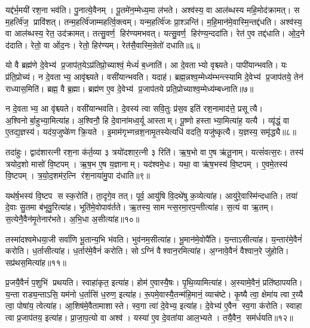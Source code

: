 यद्द॑र्भ॒मयी॑ रश॒ना भव॑ति।
पु॒नात्ये॒वैनम्।
पू॒तमे॑न॒म्मेध्य॒मा ल॑भते।
अश्व॑स्य॒ वा आल॑ब्धस्य महि॒मोद॑क्रामत्।
स म॒हर्त्वि॑ज॒ प्रावि॑शत्।
तन्म॒हर्त्वि॑जाम्महर्त्वि॒क्त्वम्।
यन्म॒हर्त्वि॑जः प्रा॒श्ञन्ति॑।
म॒हि॒मान॑मे॒वास्मि॒न्तद्द॑धति।
अश्व॑स्य॒ वा आल॑ब्धस्य॒ रेत॒ उद॑क्रामत्।
तत्सु॒वर्ण॒ हिर॑ण्यमभवत्।
यत्सु॒वर्ण॒ हिर॑ण्य॒न्ददा॑ति।
रेत॑ ए॒व तद्द॑धाति।
ओ॒द॒ने द॑दाति।
रेतो॒ वा ओ॑द॒नः।
रेतो॒ हिर॑ण्यम्।
रेत॑सै॒वास्मि॒न्रेतो॑ दधाति॥६॥\anuvakamend[द॒धा॒ति॒ रु॒न्धे॒ द॒र्भा अ॑भव॒थ्षट् च॑]

यो वै ब्रह्म॑णे दे॒वेभ्य॑ प्र॒जाप॑त॒येऽप्र॑तिप्रो॒च्याश्वं॒ मेध्यं॑ ब॒ध्नाति॑।
आ दे॒वताभ्यो वृश्च्यते।
पापी॑यान्भवति।
यः प्र॑ति॒प्रोच्य॑।
न दे॒वताभ्य॒ आवृ॑श्च्यते।
वसी॑यान्भवति।
यदाह॑।
ब्रह्म॒न्नश्व॒म्मेध्य॑म्भन्त्स्यामि दे॒वेभ्य॑ प्र॒जाप॑तये॒ तेन॑ राध्यास॒मिति॑।
ब्रह्म॒ वै ब्र॒ह्मा।
ब्रह्म॑ण ए॒व दे॒वेभ्य॑ प्र॒जाप॑तये प्रति॒प्रोच्याश्व॒म्मेध्य॑म्बध्नाति॥७॥

न दे॒वताभ्य॒ आ वृ॑श्च्यते।
वसी॑यान्भवति।
दे॒वस्य॑ त्वा सवि॒तुः प्र॑स॒व इति॑ रश॒नामाद॑त्ते॒ प्रसूत्यै।
अ॒श्विनोर्बा॒हुभ्या॒मित्या॑ह।
अ॒श्विनौ॒ हि दे॒वाना॑मध्व॒र्यू आस्ताम्।
पू॒ष्णो हस्ताभ्या॒मित्या॑ह॒ यत्यै।
व्यृ॑द्धं॒ वा ए॒तद्य॒ज्ञस्य॑।
यद॑य॒जुष्के॑ण क्रि॒यते।
इ॒माम॑गृभ्णन्रश॒नामृ॒तस्येत्यधि॑ वदति॒ यजु॑ष्कृत्यै।
य॒ज्ञस्य॒ समृ॑द्ध्यै॥८॥

तदा॑हुः।
द्वाद॑शारत्नी रश॒ना क॑र्त॒व्या ३ त्रयो॑दशार॒त्नी ३ रिति॑।
ऋ॒ष॒भो वा ए॒ष ऋ॑तू॒नाम्।
यत्सं॑वत्स॒रः।
तस्य॑ त्रयोद॒शो मासो॑ वि॒ष्टपम्।
ऋ॒ष॒भ ए॒ष य॒ज्ञानाम्।
यद॑श्वमे॒धः।
यथा॒ वा ऋ॑ष॒भस्य॑ वि॒ष्टपम्।
ए॒वमे॒तस्य॑ वि॒ष्टपम्।
त्र॒यो॒द॒शम॑र॒त्नि र॑श॒नाया॑मु॒पा द॑धाति॥९॥

यथ॑र्\mbox{}ष॒भस्य॑ वि॒ष्टप सस्क॒रोति॑।
ता॒दृगे॒व तत्।
पूर्व॒ आयु॑षि वि॒दथे॑षु क॒व्येत्या॑ह।
आयु॑रे॒वास्मि॑न्दधाति।
तया॑ दे॒वाः सु॒तमा ब॑भूवु॒रित्या॑ह।
भूति॑मे॒वोपाव॑र्तते।
ऋ॒तस्य॒ सामन्त्स॒रमा॒रप॒न्तीत्या॑ह।
स॒त्यं वा ऋ॒तम्।
स॒त्येनै॒वैन॑मृ॒तेनार॑भते।
अ॒भि॒धा अ॒सीत्या॑ह॥१०॥

तस्मा॑दश्वमेधया॒जी सर्वा॑णि भू॒तान्य॒भि भ॑वति।
भुव॑नम॒सीत्या॑ह।
भू॒मान॑मे॒वोपै॑ति।
य॒न्ताऽसीत्या॑ह।
य॒न्तार॑मे॒वैनं॑ करोति।
ध॒र्तासीत्या॑ह।
ध॒र्तार॑मे॒वैनं॑ करोति।
सोऽग्निं वैश्वान॒रमित्या॑ह।
अ॒ग्नावे॒वैनं॑ वैश्वान॒रे जु॑होति।
सप्र॑थस॒मित्या॑ह॥११॥

प्र॒जयै॒वैनं॑ प॒शुभि॑ प्रथयति।
स्वाहा॑कृत॒ इत्या॑ह।
होम॑ ए॒वास्यै॒षः।
पृ॒थि॒व्यामित्या॑ह।
अ॒स्यामे॒वैनं॒ प्रति॑ष्ठापयति।
य॒न्ता राड्य॒न्ताऽसि॒ यम॑नो ध॒र्तासि॑ ध॒रुण॒ इत्या॑ह।
रू॒पमे॒वास्यै॒तन्म॑हि॒मानं॒ व्याच॑ष्टे।
कृ॒ष्यै त्वा॒ क्षेमा॑य त्वा र॒य्यै त्वा॒ पोषा॑य॒ त्वेत्या॑ह।
आ॒शिष॑मे॒वैतामाशास्ते।
स्व॒गा त्वा॑ दे॒वेभ्य॒ इत्या॑ह।
दे॒वेभ्य॑ ए॒वैन स्व॒गा क॑रोति।
स्वाहा त्वा प्र॒जाप॑तय॒ इत्या॑ह।
प्रा॒जा॒प॒त्यो वा अश्व॑।
यस्या॑ ए॒व दे॒वता॑या आल॒भ्यते।
तयै॒वैन॒ सम॑र्धयति॥१२॥\anuvakamend[ब॒ध्ना॒ति॒ समृ॑द्ध्या उ॒पाद॑धात्य॒सीत्या॑ह॒ सप्र॑थस॒मित्या॑ह दे॒वेभ्य॒ इत्या॑ह॒ पञ्च॑ च]

